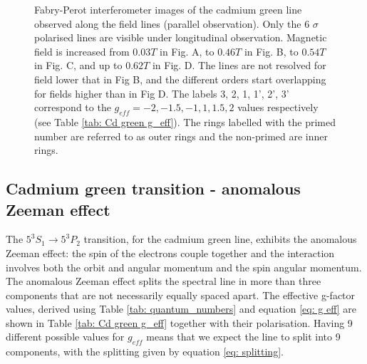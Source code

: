 \documentclass[11pt]{article}
\begin{document}
\begin{figure}[h!]
\begin{subfigure}{0.47\linewidth}
    \end{subfigure}
        \captionsetup{justification=centering}
    \caption{Fabry-Perot interferometer images of the cadmium green line observed along the field lines (parallel observation). Only the 6 $\sigma$ polarised lines are visible under longitudinal observation. Magnetic field is increased from $0.03 \si{T}$ in Fig. A, to $0.46 \si{T}$ in Fig. B, to $0.54 \si{T}$ in Fig. C, and up to $0.62 \si{T}$ in Fig. D. The lines are not resolved for field lower that in Fig B, and the different orders start overlapping for fields higher than in Fig D. The labels 3, 2, 1, 1', 2', 3' correspond to the $g_{eff} = -2, -1.5, -1, 1, 1.5, 2$ values respectively (see Table \ref{tab: Cd green g_eff}). The rings labelled with the primed number are referred to as outer rings and the non-primed are inner rings.}
    \label{img: Cd_green_sigma_increasing_field}
\end{figure}
\subsection{Cadmium green transition - anomalous Zeeman effect} \label{sec: Cd green}
The $5^3 S_1\rightarrow 5^3 P_2$ transition, for the cadmium green line, exhibits the anomalous Zeeman effect: the spin of the electrons couple together and the interaction involves both the orbit and angular momentum and the spin angular momentum. The anomalous Zeeman effect splits the spectral line in more than three components that are not necessarily equally spaced apart. The effective g-factor values, derived using Table \ref{tab: quantum_numbers} and equation \eqref{eq: g eff} are shown in Table \ref{tab: Cd green g_eff} together with their polarisation. Having 9 different possible values for $g_{eff}$ means that we expect the line to split into 9 components, with the splitting given by equation \eqref{eq: splitting}.
\end{document}
